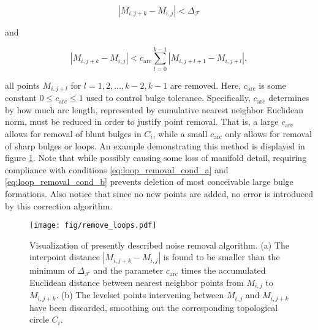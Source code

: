 \begin{equation}\label{eq:loop_removal_cond_a}
\left| M_{i,j+k} - M_{i,j} \right| < \Delta_{\mathcal{F}} 
\end{equation}

\noindent and

\begin{equation}\label{eq:loop_removal_cond_b}
\left| M_{i,j+k} - M_{i,j} \right| < c_{\text{arc}}\sum_{l=0}^{k-1} \left| M_{i,j+l+1} - M_{i,j+l} \right|,
\end{equation}

\noindent all points $M_{i,j+l}$ for $l=1,2,...,k-2,k-1$ are removed. Here, $c_{\text{arc}}$ is some constant $0\leq c_{\text{arc}}\leq 1$ used to control bulge tolerance. Specifically, $c_{\text{arc}}$ determines by how much arc length, represented by cumulative nearest neighbor Euclidean norm, must be reduced in order to justify point removal. That is, a large $c_{\text{arc}}$ allows for removal of blunt bulges in $C_i$, while a small $c_{\text{arc}}$ only allows for removal of sharp bulges or loops. An example demonstrating this method is displayed in figure \ref{fig:remove_loops}. Note that while possibly causing some loss of manifold detail, requiring compliance with conditions \eqref{eq:loop_removal_cond_a} and \eqref{eq:loop_removal_cond_b} prevents deletion of most conceivable large bulge formations. Also notice that since no new points are added, no error is introduced by this correction algorithm.

\begin{figure}[h!] 
\centering
\texttt{[image: fig/remove\_loops.pdf]}
\caption{Visualization of presently described noise removal algorithm. (a) The interpoint distance $\left| M_{i,j+k} - M_{i,j}\right|$ is found to be smaller than the minimum of $\Delta_{\mathcal{F}}$ and the parameter $c_{\text{arc}}$ times the accumulated Euclidean distance between nearest neighbor points from $M_{i,j}$ to $M_{i,j+k}$. (b) The levelset points intervening between $M_{i,j}$ and $M_{i,j+k}$ have been discarded, smoothing out the corresponding topological circle $C_i$.}\label{fig:remove_loops}
\end{figure}


